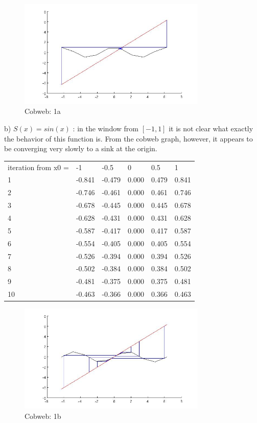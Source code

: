 \documentclass[12pt]{article}
\newenvironment{myenv}{\begin{adjustwidth}{1cm}{}}{\end{adjustwidth}}
\begin{document}
\begin{myenv}
\begin{figure} [H]
    \centering
    \includegraphics[width=0.8\textwidth]{cobweb1a}
    \caption{Cobweb: 1a}
    \label{figure:a0}
\end{figure}

b) $S(x) = sin(x)$ : in the window from $[-1,1]$ it is not clear what exactly the behavior of this function is. From the cobweb graph, however, it appears to be converging very slowly to a sink at the origin.

\begin{table}[h]
\begin{tabular}{llllll}
iteration from x0 = & -1     & -0.5   & 0     & 0.5   & 1     \\
1                   & -0.841 & -0.479 & 0.000 & 0.479 & 0.841 \\
2                   & -0.746 & -0.461 & 0.000 & 0.461 & 0.746 \\
3                   & -0.678 & -0.445 & 0.000 & 0.445 & 0.678 \\
4                   & -0.628 & -0.431 & 0.000 & 0.431 & 0.628 \\
5                   & -0.587 & -0.417 & 0.000 & 0.417 & 0.587 \\
6                   & -0.554 & -0.405 & 0.000 & 0.405 & 0.554 \\
7                   & -0.526 & -0.394 & 0.000 & 0.394 & 0.526 \\
8                   & -0.502 & -0.384 & 0.000 & 0.384 & 0.502 \\
9                   & -0.481 & -0.375 & 0.000 & 0.375 & 0.481 \\
10                  & -0.463 & -0.366 & 0.000 & 0.366 & 0.463
\end{tabular}
\end{table}

\begin{figure} [H]
    \centering
    \includegraphics[width=0.8\textwidth]{cobweb1b}
    \caption{Cobweb: 1b}
    \label{figure:a1}
\end{figure}


\end{myenv}
\end{document}

